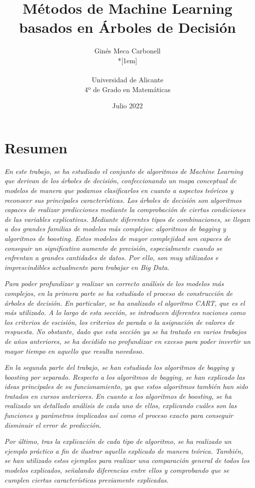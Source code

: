 \documentclass[12pt,twoside]{article}
\title{Métodos de Machine Learning basados en Árboles de Decisión}
\author{Ginés Meca Carbonell\\*[1em]
\begin{minipage}{0.75\textwidth}
\footnotesize \itshape
\begin{center}
Universidad de Alicante \\
4º de Grado en Matemáticas
\end{center}
\end{minipage}
}
\date{Julio 2022}
\begin{document}




\section*{Resumen}

\emph{En este trabajo, se ha estudiado el conjunto de algoritmos de Machine Learning que derivan de los árboles de decisión, confeccionando un mapa conceptual de modelos de manera que podamos clasificarlos en cuanto a aspectos teóricos y reconocer sus principales características. Los árboles de decisión son algoritmos capaces de realizar predicciones mediante la comprobación de ciertas condiciones de las variables explicativas. Mediante diferentes tipos de combinaciones, se llegan a dos grandes familias de modelos más complejos: algoritmos de bagging y algoritmos de boosting. Estos modelos de mayor complejidad son capaces de conseguir un significativo aumento de precisión, especialmente cuando se enfrentan a grandes cantidades de datos. Por ello, son muy utilizados e imprescindibles actualmente para trabajar en Big Data.}

\emph{Para poder profundizar y realizar un correcto análisis de los modelos más complejos, en la primera parte se ha estudiado el proceso de construcción de árboles de decisión. En particular, se ha analizado el algoritmo CART, que es el más utilizado. A lo largo de esta sección, se introducen diferentes nociones como los criterios de escisión, los criterios de parada o la asignación de valores de respuesta. No obstante, dado que esta sección ya se ha tratado en varios trabajos de años anteriores, se ha decidido no profundizar en exceso para poder invertir un mayor tiempo en aquello que resulta novedoso.}

\emph{En la segunda parte del trabajo, se han estudiado los algoritmos de bagging y boosting por separado. Respecto a los algoritmos de bagging, se han explicado las ideas principales de su funcionamiento, ya que estos algoritmos también han sido tratados en cursos anteriores. En cuanto a los algoritmos de boosting, se ha realizado un detallado análisis de cada uno de ellos, explicando cuáles son las funciones y parámetros implicados así como el proceso exacto para conseguir disminuir el 
error de predicción.}

\emph{Por último, tras la explicación de cada tipo de algoritmo, se ha realizado un ejemplo práctico a fin de ilustrar aquello explicado de manera teórica. También, se han utilizado estos ejemplos para realizar una comparación general de todos los modelos explicados, señalando diferencias entre ellos y comprobando que se cumplen ciertas características previamente explicadas.}
\end{document}

